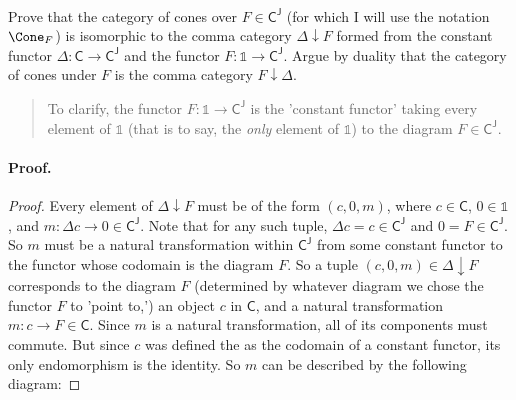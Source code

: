 \documentclass[../../main]{subfiles}
\begin{document}
	
\paragraph{} 

\begin{exercise}
Prove that the category of cones over $ F \in \mathsf{C^J} $ (for which I will
use the notation $ \Cone_F $) is isomorphic to the comma category $
\Delta \downarrow F $ formed from the constant functor $ \Delta \colon
\mathsf{C} \to \mathsf{C^J} $ and the functor $ F \colon \mathbb{1} \to
\mathsf{C^J} $. Argue by duality that the category of cones under $ F $ is the
comma category $ F \downarrow \Delta $.
\end{exercise}
\begin{quote}
	{\small To clarify, the functor $ F \colon \mathbb{1} \to \mathsf{C^J}$ is the 'constant functor' taking every element of  $ \mathbb{1} $ (that is to say, the \textit{only} element of $ \mathbb{1} $) to the diagram $ F \in \mathsf{C^J} $.}
\end{quote}

\paragraph{Proof.} 
\begin{proof}
Every element of $ \Delta \downarrow F $ must be of the form $ (c, 0, m) $,
where $ c \in \textsf{C} $, $ 0 \in \mathbb{1} $, and $ m \colon \Delta c \to 0
\in \mathsf{C^J} $. Note that for any such tuple, $ \Delta c = c \in
\mathsf{C^J}$ and $ 0 = F \in \mathsf{C^J}$. So $ m $ must be a natural
transformation within $ \mathsf{C^J} $ from some constant functor to the
functor whose codomain is the diagram $ F $. So a tuple $ (c, 0, m) \in \Delta
\downarrow F $ corresponds to the diagram $ F $ (determined by whatever diagram
we chose the functor $ F $ to 'point to,') an object $ c $ in $ \mathsf{C} $,
and a natural transformation $ m \colon c \to F \in \mathsf{C}$. Since $ m $ is
a natural transformation, all of its components must commute. But since $ c $
was defined the as the codomain of a constant functor, its only endomorphism is
the identity. So $ m $ can be described by the following diagram:
\end{proof}

\end{document}
